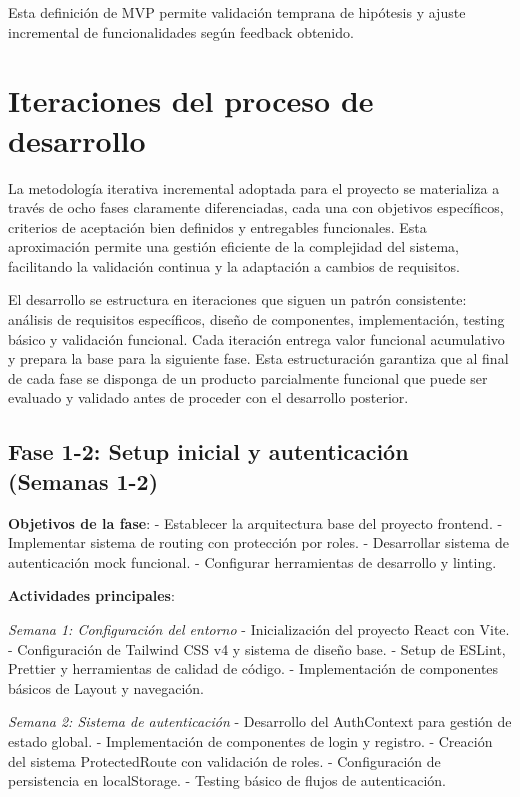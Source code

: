 \documentclass[12pt,a4paper,oneside]{report}
\begin{document}
Esta definición de MVP permite validación temprana de hipótesis y ajuste
incremental de funcionalidades según feedback obtenido.

\section{Iteraciones del proceso de
desarrollo}\label{iteraciones-del-proceso-de-desarrollo}

La metodología iterativa incremental adoptada para el proyecto se
materializa a través de ocho fases claramente diferenciadas, cada una
con objetivos específicos, criterios de aceptación bien definidos y
entregables funcionales. Esta aproximación permite una gestión eficiente
de la complejidad del sistema, facilitando la validación continua y la
adaptación a cambios de requisitos.

El desarrollo se estructura en iteraciones que siguen un patrón
consistente: análisis de requisitos específicos, diseño de componentes,
implementación, testing básico y validación funcional. Cada iteración
entrega valor funcional acumulativo y prepara la base para la siguiente
fase. Esta estructuración garantiza que al final de cada fase se
disponga de un producto parcialmente funcional que puede ser evaluado y
validado antes de proceder con el desarrollo posterior.

\subsection{Fase 1-2: Setup inicial y autenticación (Semanas
1-2)}\label{fase-1-2-setup-inicial-y-autenticaciuxf3n-semanas-1-2}

\textbf{Objetivos de la fase}: - Establecer la arquitectura base del
proyecto frontend. - Implementar sistema de routing con protección por
roles. - Desarrollar sistema de autenticación mock funcional. -
Configurar herramientas de desarrollo y linting.

\textbf{Actividades principales}:

\emph{Semana 1: Configuración del entorno} - Inicialización del proyecto
React con Vite. - Configuración de Tailwind CSS v4 y sistema de diseño
base. - Setup de ESLint, Prettier y herramientas de calidad de código. -
Implementación de componentes básicos de Layout y navegación.

\emph{Semana 2: Sistema de autenticación} - Desarrollo del AuthContext
para gestión de estado global. - Implementación de componentes de login
y registro. - Creación del sistema ProtectedRoute con validación de
roles. - Configuración de persistencia en localStorage. - Testing básico
de flujos de autenticación.
\end{document}
